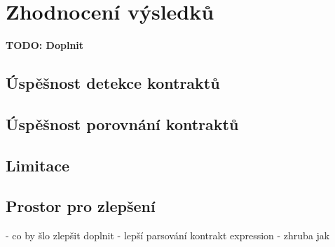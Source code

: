 \chapter{Zhodnocení výsledků}
	\textbf{\textcolor{pblue}{TODO: Doplnit}}\\
	\section{Úspěšnost detekce kontraktů}
	
	\section{Úspěšnost porovnání kontraktů}
	
 	\section{Limitace}
 	
 	\section{Prostor pro zlepšení}
 		- co by šlo zlepšit doplnit
  		- lepší parsování kontrakt expression - zhruba jak